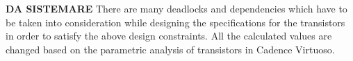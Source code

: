 \section*{}
\begin{flushright}
\textbf{DA SISTEMARE}
	There are many deadlocks and
	dependencies which have to be taken into consideration while designing the specifications
	for the transistors in order to satisfy the above design constraints. All the calculated
	values are changed based on the parametric analysis of transistors in Cadence Virtuoso.
\end{flushright}